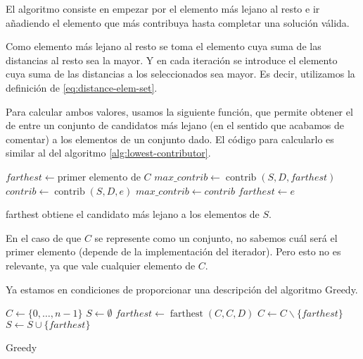 \documentclass{article}
\begin{document}
El algoritmo consiste en empezar por el elemento más lejano al resto e ir añadiendo el elemento que más contribuya hasta completar una solución
válida.

Como elemento más lejano al resto se toma el elemento cuya suma de las distancias al resto sea la mayor. Y en cada iteración se introduce el elemento
cuya suma de las distancias a los seleccionados sea mayor. Es decir, utilizamos la definición de \eqref{eq:distance-elem-set}.

Para calcular ambos valores, usamos la siguiente función, que permite obtener el de entre
un conjunto de candidatos más lejano (en el sentido que acabamos de comentar) a los elementos de un conjunto dado.
El código para calcularlo es similar al del algoritmo \ref{alg:lowest-contributor}.

 \begin{algorithm}[H]
	\DontPrintSemicolon %
	$farthest \gets \text{primer elemento de } C$\;
	$max\_contrib \gets \operatorname{contrib}(S,D,farthest)$\;
	 {
		$contrib \gets \operatorname{contrib}(S,D,e)$\;
		 { 
			$max\_contrib \gets contrib$\;
			$farthest \gets e$ 
		}
	}
	\;
	\caption{{\sc farthest} obtiene el candidato más lejano a los elementos de $S$.}
	\label{alg:farthest-candidate-set}
\end{algorithm}

En el caso de que $C$ se represente como un conjunto, no sabemos cuál será el primer elemento (depende de la implementación del iterador). Pero
esto no es relevante, ya que vale cualquier elemento de $C$.

Ya estamos en condiciones de proporcionar una descripción del algoritmo Greedy.

 \begin{algorithm}[H]
	\DontPrintSemicolon %
	$C \gets \{0,\ldots, n-1\}$ 
	$S \gets \emptyset$ 
	$farthest \gets \operatorname{farthest}(C,C,D)$ 
	$C \gets C\backslash \{farthest\}$\;
	$S \gets S\cup \{farthest\}$\;
	\;
	\;
	\caption{{\sc Greedy}}
	\label{alg:greedy}
\end{algorithm}
\end{document}
